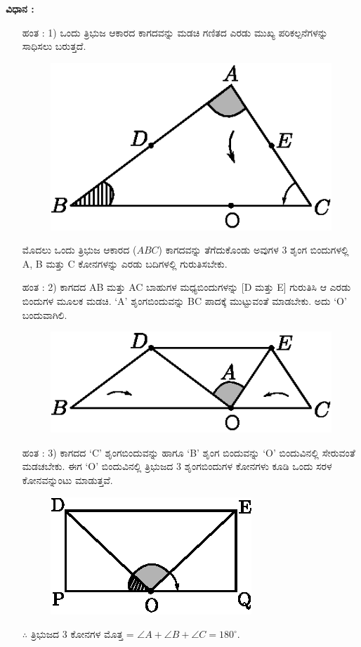 \noindent
\textbf{ವಿಧಾನ :} 
\begin{itemize}
\item[ಹಂತ : 1)]  ಒಂದು ತ್ರಿಭುಜ ಆಕಾರದ ಕಾಗದವನ್ನು ಮಡಚಿ ಗಣಿತದ ಎರಡು ಮುಖ್ಯ ಪರಿಕಲ್ಪನೆಗಳನ್ನು ಸಾಧಿಸಲು ಬರುತ್ತದೆ. 
  \begin{figure}[H]
\centering
\includegraphics[scale=.85]{src/figure/chap1/fig1-39a.eps}
\end{figure}
 
 ಮೊದಲು ಒಂದು ತ್ರಿಭುಜ ಆಕಾರದ ($ABC$) ಕಾಗದವನ್ನು ತೆಗೆದುಕೊಂಡು ಅವುಗಳ 3 ಶೃಂಗ ಬಿಂದುಗಳಲ್ಲಿ A, B ಮತ್ತು C ಕೋನಗಳನ್ನು ಎರಡು ಬದಿಗಳಲ್ಲಿ ಗುರುತಿಸಬೇಕು. 
  
\item[ಹಂತ : 2)] ಕಾಗದದ AB ಮತ್ತು AC ಬಾಹುಗಳ ಮಧ್ಯಬಿಂದುಗಳನ್ನು [D ಮತ್ತು E] ಗುರುತಿಸಿ ಆ ಎರಡು ಬಿಂದುಗಳ ಮೂಲಕ ಮಡಚಿ. `A' ಶೃಂಗಬಿಂದುವನ್ನು BC ಪಾದಕ್ಕೆ ಮುಟ್ಟುವಂತೆ ಮಾಡಬೇಕು. ಅದು `O' ಬಂದುವಾಗಿಲಿ. 
\begin{figure}[H]
\centering
\includegraphics[scale=.85]{src/figure/chap1/fig1-39b.eps}\\
\end{figure}
 
\item[ಹಂತ : 3)] ಕಾಗದದ `C' ಶೃಂಗಬಿಂದುವನ್ನು ಹಾಗೂ `B' ಶೃಂಗ ಬಿಂದುವನ್ನು  `O' ಬಿಂದುವಿನಲ್ಲಿ ಸೇರುವಂತೆ ಮಡಚಬೇಕು. ಈಗ  `O' ಬಿಂದುವಿನಲ್ಲಿ ತ್ರಿಭುಜದ 3  ಶೃಂಗಬಿಂದುಗಳ ಕೋನಗಳು ಕೂಡಿ ಒಂದು ಸರಳ ಕೋನವನ್ನುಂಟು ಮಾಡುತ್ತವೆ.
 \begin{figure}[H]
\centering
\includegraphics[scale=.9]{src/figure/chap1/fig1-39bb.eps}\\
\end{figure}
$\therefore $ ತ್ರಿಭುಜದ 3  ಕೋನಗಳ ಮೊತ್ತ  = $\angle A + \angle  B + \angle C = 180^\circ$.


\end{itemize}
